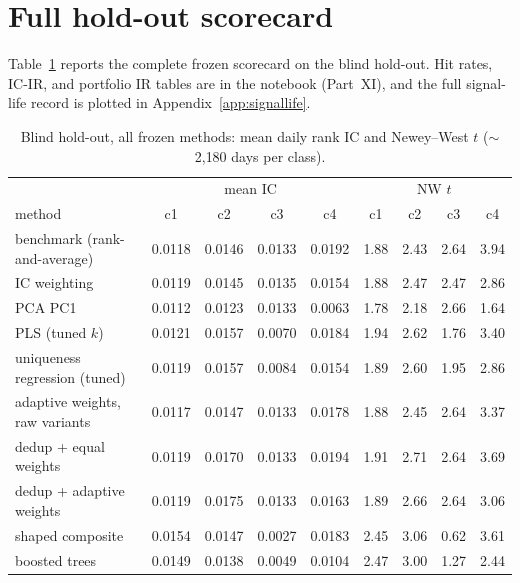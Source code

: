 \documentclass[11pt]{article}
\begin{document}
\clearpage
\begingroup\footnotesize
\setlength{\bibsep}{3pt}
\enlargethispage{2\baselineskip}


\endgroup

\clearpage
\appendix

\FloatBarrier
\section{Full hold-out scorecard}
\label{app:scorecard}

Table~\ref{tab:fullscorecard} reports the complete frozen scorecard on the blind
hold-out. Hit rates, IC-IR, and portfolio IR tables are in the notebook (Part~XI), and
the full signal-life record is plotted in Appendix~\ref{app:signallife}.

\begin{table}[!htbp]
\centering
\footnotesize
\caption{Blind hold-out, all frozen methods: mean daily rank IC and Newey--West $t$
($\sim$2{,}180 days per class).}
\label{tab:fullscorecard}
\begin{tabular}{lcccc@{\hspace{1.8em}}cccc}
\toprule
 & \multicolumn{4}{c}{mean IC} & \multicolumn{4}{c}{NW $t$} \\
method & c1 & c2 & c3 & c4 & c1 & c2 & c3 & c4 \\
\midrule
benchmark (rank-and-average)  & 0.0118 & 0.0146 & 0.0133 & 0.0192 & 1.88 & 2.43 & 2.64 & 3.94 \\
IC weighting                  & 0.0119 & 0.0145 & 0.0135 & 0.0154 & 1.88 & 2.47 & 2.47 & 2.86 \\
PCA PC1                       & 0.0112 & 0.0123 & 0.0133 & 0.0063 & 1.78 & 2.18 & 2.66 & 1.64 \\
PLS (tuned $k$)               & 0.0121 & 0.0157 & 0.0070 & 0.0184 & 1.94 & 2.62 & 1.76 & 3.40 \\
uniqueness regression (tuned) & 0.0119 & 0.0157 & 0.0084 & 0.0154 & 1.89 & 2.60 & 1.95 & 2.86 \\
adaptive weights, raw variants & 0.0117 & 0.0147 & 0.0133 & 0.0178 & 1.88 & 2.45 & 2.64 & 3.37 \\
dedup + equal weights         & 0.0119 & 0.0170 & 0.0133 & 0.0194 & 1.91 & 2.71 & 2.64 & 3.69 \\
dedup + adaptive weights      & 0.0119 & 0.0175 & 0.0133 & 0.0163 & 1.89 & 2.66 & 2.64 & 3.06 \\
shaped composite              & 0.0154 & 0.0147 & 0.0027 & 0.0183 & 2.45 & 3.06 & 0.62 & 3.61 \\
boosted trees                 & 0.0149 & 0.0138 & 0.0049 & 0.0104 & 2.47 & 3.00 & 1.27 & 2.44 \\
\bottomrule
\end{tabular}
\end{table}
\end{document}

